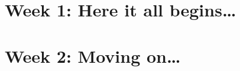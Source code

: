 \documentclass[11pt,a4paper]{book}
\begin{document}
\chapter{Week 1: Here it all begins\ldots}






% 
\chapter{Week 2: Moving on\ldots}




% 
\end{document}
